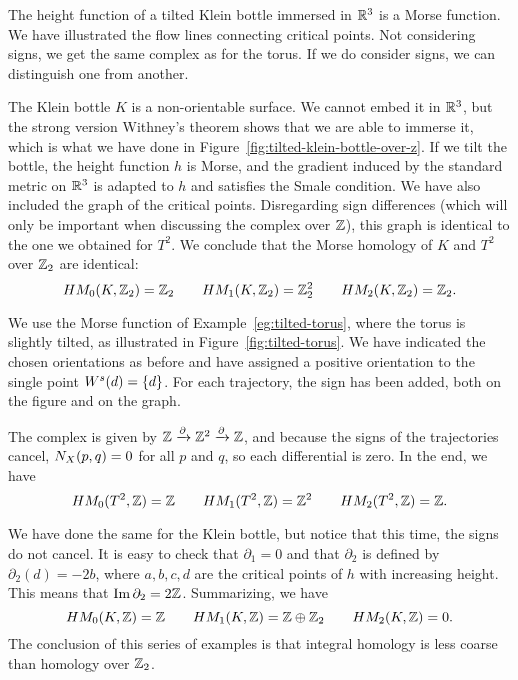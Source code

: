 \begin{eg}
    \begin{marginfigure}
        \centering
        \caption{The height function of a tilted Klein bottle immersed in $\R^3$ is a Morse function.
            We have illustrated the flow lines connecting critical points.
            Not considering signs, we get the same complex as for the torus. If we do consider signs, we can distinguish one from another.
        }
        \label{fig:tilted-klein-bottle-over-z}
    \end{marginfigure}
    The Klein bottle $K$ is a non-orientable surface. We cannot embed it in $\R^3$, but the strong version Withney's theorem shows that we are able to immerse it, which is what we have done in Figure~\ref{fig:tilted-klein-bottle-over-z}.
    If we tilt the bottle, the height function $h$ is Morse, and the gradient induced by the standard metric on $\R^3$ is adapted to $h$ and satisfies the Smale condition.
    We have also included the graph of the critical points.
    Disregarding sign differences (which will only be important when discussing the complex over $\Z$), this graph is identical to the one we obtained for $T^2$. We conclude that the Morse homology of $K$ and  $T^2$ over $\Z_2$ are identical:
    \[
        \HMf[0]{K, \Z_2} = \Z_2 \qquad
        \HMf[1]{K, \Z_2} = \Z_2^2 \qquad
        \HMf[2]{K, \Z_2} = \Z_2
    .\] 
\end{eg}

\begin{eg}
    We use the Morse function of Example~\ref{eg:tilted-torus}, where the torus is slightly tilted, as illustrated in Figure~\ref{fig:tilted-torus}.
    We have indicated the chosen orientations as before and have assigned a positive orientation to the single point $\stable d = \{d\}$.
    For each trajectory, the sign has been added, both on the figure and on the graph.

    The complex is given by $\Z \xrightarrow{\partial} \Z^2 \xrightarrow{\partial}  \Z$, and because the signs of the trajectories cancel, $\NX Xpq = 0$ for all $p$ and $q$, so each differential is zero.
    In the end, we have
    \[
        \HMf[0]{T^2, \Z} = \Z \qquad
        \HMf[1]{T^2, \Z} = \Z^2 \qquad
        \HMf[2]{T^2, \Z} = \Z
    .\] 
\end{eg}
\begin{eg}
    We have done the same for the Klein bottle, but notice that this time, the signs do not cancel.
    It is easy to check that $\partial_1 = 0$ and that  $\partial_2$ is defined by  $\partial_2(d) = -2b$, where $a,b,c,d$ are the critical points of $h$ with increasing height.
    This means that $\Im \partial_2 = 2 \Z$. Summarizing, we have
    \[
        \HMf[0]{K, \Z} = \Z \qquad
        \HMf[1]{K, \Z} = \Z \oplus \Z_2 \qquad
        \HMf[2]{K, \Z} = 0
    .\] 
    The conclusion of this series of examples is that integral homology is less coarse than homology over $\Z_2$.
\end{eg}


